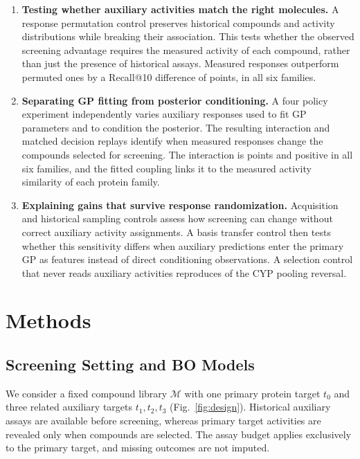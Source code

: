 \documentclass[10pt,letterpaper,runningheads]{llncs}
\begin{document}
\begin{enumerate}
\item \textbf{Testing whether auxiliary activities match the right molecules.}
A response permutation control preserves historical compounds and
activity distributions while breaking their association. This tests
whether the observed screening advantage requires the measured activity
of each compound, rather than just the presence of historical assays.
Measured responses outperform permuted ones by a Recall@10 difference
of \crossPrimary{} points, in all six families.

\item \textbf{Separating GP fitting from posterior conditioning.}
A four policy experiment independently varies auxiliary responses used
to fit GP parameters and to condition the posterior. The resulting
interaction and matched decision replays identify when measured
responses change the compounds selected for screening. The interaction
is \crossInteraction{} points and positive in all six families, and the
fitted coupling links it to the measured activity similarity of each
protein family.

\item \textbf{Explaining gains that survive response randomization.}
Acquisition and historical sampling controls assess how screening can
change without correct auxiliary activity assignments. A basis transfer
control then tests whether this sensitivity differs when auxiliary
predictions enter the primary GP as features instead of direct
conditioning observations. A selection control that never reads
auxiliary activities reproduces \avoidRecallFracHundred{} of the CYP
pooling reversal.

\end{enumerate}



\section{Methods}
\label{sec:framework}

\subsection{Screening Setting and BO Models}
\label{sec:matrix}

We consider a fixed compound library $\mathcal M$ with one
primary protein target $t_0$ and three related auxiliary
targets $t_1,t_2,t_3$ (Fig.~\ref{fig:design}).
Historical auxiliary assays are available before screening,
whereas primary target activities are revealed only when
compounds are selected. The assay budget applies exclusively
to the primary target, and missing outcomes are not imputed.
\end{document}
